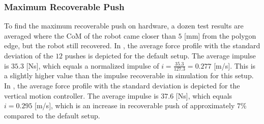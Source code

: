 \subsubsection{Maximum Recoverable Push}
To find the maximum recoverable push on hardware, a dozen test results are averaged where the \ac{CoM} of the robot came closer than $5$ [mm] from the polygon edge, but the robot still recovered. In , the average force profile with the standard deviation of the $12$ pushes is depicted for the default setup. The average impulse is $35.3$ [Ns], which equals a normalized impulse of $i=\frac{35.3}{127.3}=0.277$ [m/s]. This is a slightly higher value than the impulse recoverable in simulation for this setup. In , the average force profile with the standard deviation is depicted for the vertical motion controller. The average impulse is $37.6$ [Ns], which equals $i=0.295$ [m/s], which is an increase in recoverable push of approximately $7$\% compared to the default setup.
